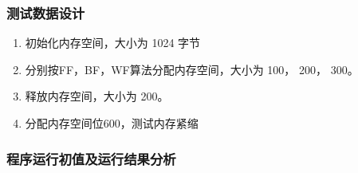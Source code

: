 \documentclass{article}
\begin{document}
    \subsubsection{测试数据设计}

    \begin{enumerate}
        \item 初始化内存空间，大小为 1024 字节
        \item 分别按FF，BF，WF算法分配内存空间，大小为 100， 200， 300。
        \item 释放内存空间，大小为 200。
        \item 分配内存空间位600，测试内存紧缩
    \end{enumerate}

    \newpage
    \subsubsection{程序运行初值及运行结果分析}
\end{document}
